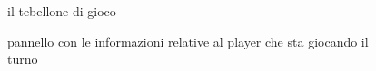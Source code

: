 \begin{figure}[H]
    \centering
    \caption{il tebellone di gioco}
	\label{img:gamescreen}
\end{figure}
\begin{figure}[H]
    \centering
    \caption{pannello con le informazioni relative al player che sta giocando il turno}
	\label{img:gamescreen}
\end{figure}
